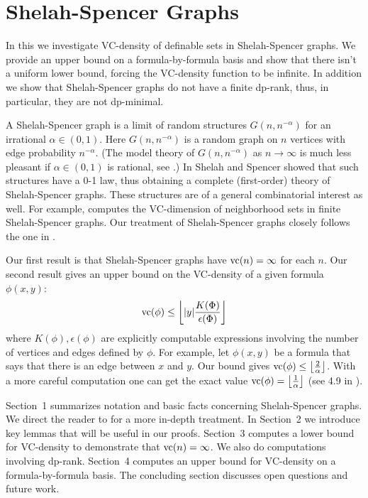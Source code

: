 \chapter{Shelah-Spencer Graphs}
In this \chapa we investigate VC-density of definable sets in Shelah-Spencer graphs.
We provide an upper bound on a formula-by-formula basis and show that there isn't a uniform lower bound,
forcing the VC-density function to be infinite.
In addition we show that Shelah-Spencer graphs do not have a finite dp-rank,
thus, in particular, they are not dp-minimal.


A Shelah-Spencer graph is a limit of random structures $G(n, n^{-\alpha})$ for an irrational $\alpha \in (0,1)$.
Here $G(n, n^{-\alpha})$ is a random graph on $n$ vertices with edge probability $n^{-\alpha}$.
(The model theory of $G(n, n^{-\alpha})$ as $n \to \infty$ is much less pleasant if $\alpha \in (0,1)$ is rational, see \cite{rational}.)
In \cite{spencer} Shelah and Spencer showed that such structures have a 0-1 law, thus obtaining
a complete (first-order) theory of Shelah-Spencer graphs.
These structures are of a general combinatorial interest as well.
For example, \cite{anthony} computes the VC-dimension of neighborhood sets in finite Shelah-Spencer graphs.
Our treatment of Shelah-Spencer graphs closely follows the one in \cite{laskowski}.

Our first result is that Shelah-Spencer graphs have $\operatorname{vc}(n) = \infty$ for each $n$.
Our second result gives an upper bound on the VC-density of a given formula $\phi(x, y)$:
\begin{align*}
  \operatorname{vc}(\phi) \leq \left \lfloor |y|\frac{K(\Phi)}{\epsilon(\Phi)} \right \rfloor
\end{align*}
where $K(\phi), \epsilon(\phi)$ are explicitly computable expressions involving the number of vertices and edges defined by $\phi$.
For example, let $\phi(x,y)$ be a formula that says that there is an edge between $x$ and $y$.
Our bound gives $\operatorname{vc}(\phi) \leq \left \lfloor \frac{2}{\alpha} \right \rfloor$.
With a more careful computation one can get the exact value $\operatorname{vc}(\phi) = \left \lfloor \frac{1}{\alpha} \right \rfloor$ (see 4.9 in \cite{density}).

Sec\-tion~1 summarizes notation and basic facts concerning Shelah-Spencer graphs.
We direct the reader to \cite{laskowski} for a more in-depth treatment.
In Sec\-tion~2 we introduce key lemmas that will be useful in our proofs.
Sec\-tion~3 computes a lower bound for VC-density to demonstrate that $\operatorname{vc}(n) = \infty$.
We also do computations involving dp-rank.
Sec\-tion~4 computes an upper bound for VC-density on a formula-by-formula basis.
The concluding section discusses open questions and future work.

